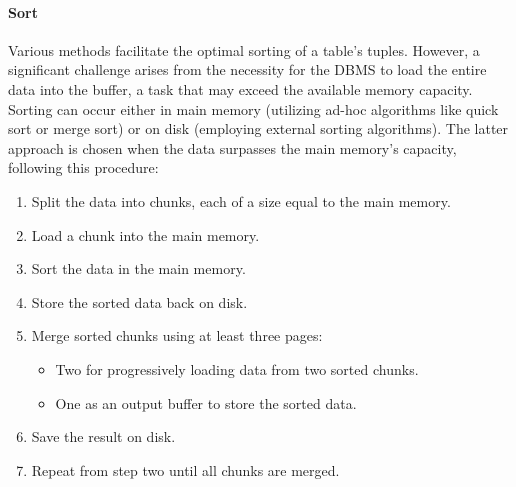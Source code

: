\paragraph*{Sort}
Various methods facilitate the optimal sorting of a table's tuples. 
However, a significant challenge arises from the necessity for the DBMS to load the entire data into the buffer, a task that may exceed the available memory capacity.
Sorting can occur either in main memory (utilizing ad-hoc algorithms like quick sort or merge sort) or on disk (employing external sorting algorithms).
The latter approach is chosen when the data surpasses the main memory's capacity, following this procedure:
\begin{enumerate}
    \item Split the data into chunks, each of a size equal to the main memory.
    \item Load a chunk into the main memory.
    \item Sort the data in the main memory.
    \item Store the sorted data back on disk.
    \item Merge sorted chunks using at least three pages:
        \begin{itemize}
            \item Two for progressively loading data from two sorted chunks.
            \item One as an output buffer to store the sorted data.
        \end{itemize}
    \item Save the result on disk.
    \item Repeat from step two until all chunks are merged.
\end{enumerate}

